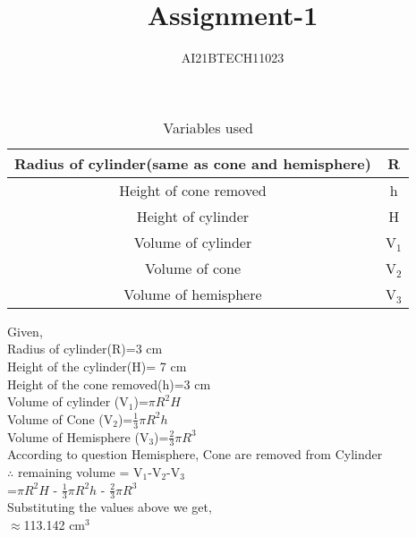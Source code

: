 \documentclass[12pt]{article}
\begin{document}
\title{Assignment-1}
\author{AI21BTECH11023}
\maketitle
\begin{table}
\caption{Variables used}
\begin{tabular}{c c}
\hline
Radius of cylinder(same as cone and hemisphere) & R\\
\hline
Height of cone removed & h\\
\hline
Height of cylinder & H\\
\hline
Volume of cylinder & V$_1$\\
\hline
Volume of cone  & V$_2$\\
\hline
Volume of hemisphere & V$_3$\\
\hline
\end{tabular}
\end{table}
Given,\\
Radius of cylinder(R)=3 cm\\
Height of the cylinder(H)= 7 cm\\
Height of the cone removed(h)=3 cm\\
Volume of cylinder (V$_1$)=$\pi R^2 H$\\
Volume of Cone (V$_2$)=$\frac{1}{3} \pi R^2 h$\\
Volume of Hemisphere (V$_3$)=$\frac{2}{3} \pi R^3$\\
According to question Hemisphere, Cone are removed from Cylinder\\
$\therefore$ remaining volume = V$_1$-V$_2$-V$_3$\\
=$\pi R^2 H$ - $\frac{1}{3} \pi R^2 h$ - $\frac{2}{3} \pi R^3$\\
Substituting the values above we get,\\
$\approx$113.142 cm$^3$
\end{document}
